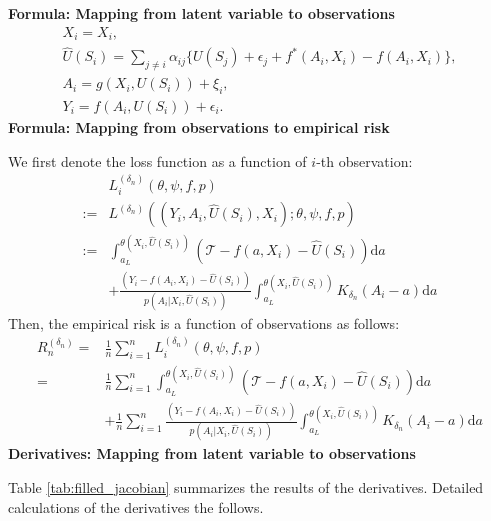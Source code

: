 \documentclass[12pt]{article}
\begin{document}
\noindent \textbf{Formula: Mapping from latent variable to observations}
\begin{gather}
    X_i = X_i,\nonumber\\
    \widehat U(S_i) = \sum_{j\neq i}\alpha_{ij}\{U(S_j)+\epsilon_j+f^*(A_i,X_i) - f(A_i,X_i)\},\label{eq:widehat_U_i}\\
    A_i = g(X_i,U(S_i)) +\xi_i,\nonumber\\
    Y_i = f(A_i,U(S_i))+\epsilon_i.\nonumber
\end{gather}
\noindent \textbf{Formula: Mapping from observations to empirical risk}

\noindent We first denote the loss function as a function of $i$-th observation:
\begin{align}
& L^{(\delta_n)}_i(\theta,\psi,f,p)\nonumber\\
:=&L^{(\delta_n)}((Y_i,A_i,\widehat U(S_i),X_i);\theta,\psi,f,p)\label{eq:loss_function_i}\\
:= & \int_{a_L}^{\theta(X_i,\widehat U(S_i))}(\mathcal{T} - f(a,X_i)-\widehat U(S_i))\mathrm{d}a\nonumber\\
    & + \frac{(Y_i -  f(A_i,X_i)-\widehat U(S_i))}{p(A_{i}|X_{i},\widehat U(S_{i}))}  \int_{a_L}^{\theta(X_i,\widehat U(S_i))}K_{\delta_n}(A_i-a)\mathrm{d}a\nonumber
\end{align}
Then, the empirical risk is a function of observations as follows:
\begin{align*}
R_n^{(\delta_n)} = &\frac{1} {n}\sum_{i=1}^n L^{(\delta_n)}_i(\theta,\psi,f,p)\\
 = &\frac{1}{n}\sum_{i=1}^n\int_{a_L}^{\theta(X_i,\widehat U(S_i))}(\mathcal{T} - f(a,X_i)-\widehat U(S_i))\mathrm{d}a\\
    & + \frac{1}{n}\sum_{i=1}^n\frac{(Y_i -  f(A_i,X_i)-\widehat U(S_i))}{p(A_{i}|X_{i},\widehat U(S_{i}))}  \int_{a_L}^{\theta(X_i,\widehat U(S_i))}K_{\delta_n}(A_i-a)\mathrm{d}a
\end{align*}
\noindent \textbf{Derivatives: Mapping from latent variable to observations}

\noindent Table \ref{tab:filled_jacobian} summarizes the results of the derivatives. Detailed calculations of the derivatives the follows.
\end{document}
